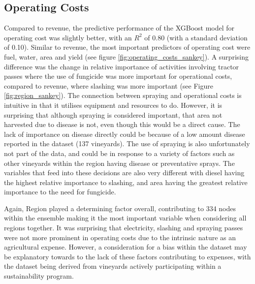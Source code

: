 \documentclass[review,12pt,authoryear]{elsarticle}
\begin{document}
\begin{linenumbers}
\subsection{Operating Costs}


Compared to revenue, the predictive performance of the XGBoost model for operating cost was slightly better, with an $R^2$ of 0.80 (with a standard deviation of 0.10). Similar to revenue, the most important predictors of operating cost were fuel, water, area and yield (see figure \ref{fig:operating_costs_sankey}). A surprising difference was the change in relative importance of activities involving tractor passes where the use of fungicide was more important for operational costs, compared to revenue, where slashing was more important (see Figure \ref{fig:region_sankey}). The connection between spraying and operational costs is intuitive in that it utilises equipment and resources to do. However, it is surprising that although spraying is considered important, that area not harvested due to disease is not, even though this would be a direct cause. The lack of importance on disease directly could be because of a low amount disease reported in the dataset (137 vineyards). The use of spraying is also unfortunately not part of the data, and could be in response to a variety of factors such as other vineyards within the region having disease or preventative sprays. The variables that feed into these decisions are also very different with diesel having the highest relative importance to slashing, and area having the greatest relative importance to the need for fungicide.
\par
Again, Region played a determining factor overall, contributing to 334 nodes within the ensemble making it the most important variable when considering all regions together. It was surprising that electricity, slashing and spraying passes were not more prominent in operating costs due to the intrinsic nature as an agricultural expense. However, a consideration for a bias within the dataset may be explanatory towards to the lack of these factors contributing to expenses, with the dataset being derived from vineyards actively participating within a sustainability program.

\end{linenumbers}
\end{document}
